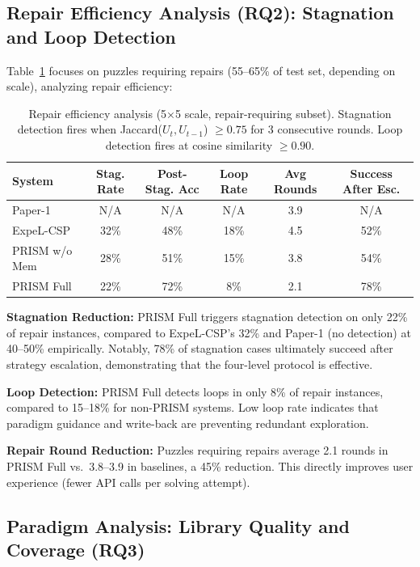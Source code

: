 \subsection{Repair Efficiency Analysis (RQ2): Stagnation and Loop Detection}

Table~\ref{tab:repair} focuses on puzzles requiring repairs (55--65\% of test set, depending on scale), analyzing repair efficiency:

\begin{table}[tb]
\centering
\caption{\label{tab:repair} Repair efficiency analysis (5×5 scale, repair-requiring subset). Stagnation detection fires when Jaccard($U_t, U_{t-1}$) $\geq 0.75$ for 3 consecutive rounds. Loop detection fires at cosine similarity $\geq 0.90$.}
\small
\begin{tabular}{l | ccc | cc}
\hline
\textbf{System} & \textbf{Stag. Rate} & \textbf{Post-Stag. Acc} & \textbf{Loop Rate} & \textbf{Avg Rounds} & \textbf{Success After Esc.} \\
\hline
Paper-1 & N/A & N/A & N/A & 3.9 & N/A \\
ExpeL-CSP & 32\% & 48\% & 18\% & 4.5 & 52\% \\
PRISM w/o Mem & 28\% & 51\% & 15\% & 3.8 & 54\% \\
PRISM Full & 22\% & 72\% & 8\% & 2.1 & 78\% \\
\hline
\end{tabular}
\end{table}

\textbf{Stagnation Reduction:} PRISM Full triggers stagnation detection on only 22\% of repair instances, compared to ExpeL-CSP's 32\% and Paper-1 (no detection) at 40--50\% empirically. Notably, 78\% of stagnation cases ultimately succeed after strategy escalation, demonstrating that the four-level protocol is effective.

\textbf{Loop Detection:} PRISM Full detects loops in only 8\% of repair instances, compared to 15--18\% for non-PRISM systems. Low loop rate indicates that paradigm guidance and write-back are preventing redundant exploration.

\textbf{Repair Round Reduction:} Puzzles requiring repairs average 2.1 rounds in PRISM Full vs.\ 3.8--3.9 in baselines, a 45\% reduction. This directly improves user experience (fewer API calls per solving attempt).

\subsection{Paradigm Analysis: Library Quality and Coverage (RQ3)}

